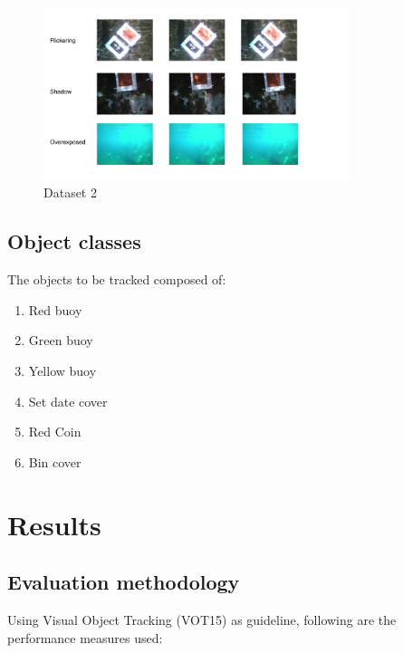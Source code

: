 \documentclass[hyp]{socreport}
\begin{document}
\begin{figure}[H]
\centering
  \includegraphics[width=0.8\textwidth, height=0.3\textheight]{data2.png}
  \caption{Dataset 2}
  \label{fig:dataset2}
\end{figure}

\subsection{Object classes}

The objects to be tracked composed of:

\begin{enumerate}
  \item Red buoy
  \item Green buoy
  \item Yellow buoy
  \item Set date cover
  \item Red Coin
  \item Bin cover
\end{enumerate}

\section{Results}

\subsection{Evaluation methodology}

Using Visual Object Tracking (VOT15)  as guideline,
following are the performance measures used:
\end{document}
